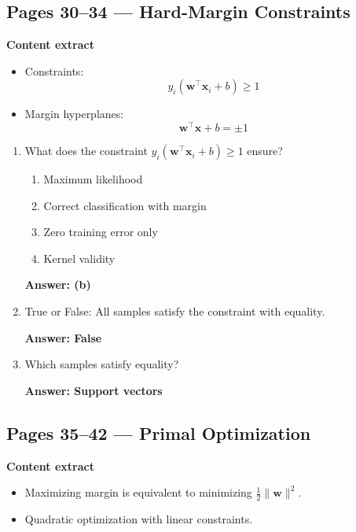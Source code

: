 \documentclass[12pt]{article}
\begin{document}
\subsection*{Pages 30--34 — Hard-Margin Constraints}

\textbf{Content extract}
\begin{itemize}
	\item Constraints:
	\[
	y_i(\mathbf{w}^\top \mathbf{x}_i + b) \ge 1
	\]
	\item Margin hyperplanes:
	\[
	\mathbf{w}^\top \mathbf{x} + b = \pm 1
	\]
\end{itemize}

\begin{enumerate}
	\item What does the constraint $y_i(\mathbf{w}^\top \mathbf{x}_i + b)\ge1$ ensure?
	\begin{enumerate}
		\item Maximum likelihood
		\item Correct classification with margin
		\item Zero training error only
		\item Kernel validity
	\end{enumerate}
	\textbf{Answer: (b)}
	
	\item True or False: All samples satisfy the constraint with equality.
	
	\textbf{Answer: False}
	
	\item Which samples satisfy equality?
	
	\textbf{Answer: Support vectors}
\end{enumerate}


\subsection*{Pages 35--42 — Primal Optimization}

\textbf{Content extract}
\begin{itemize}
	\item Maximizing margin is equivalent to minimizing $\frac{1}{2}\|\mathbf{w}\|^2$.
	\item Quadratic optimization with linear constraints.
\end{itemize}
\end{document}
